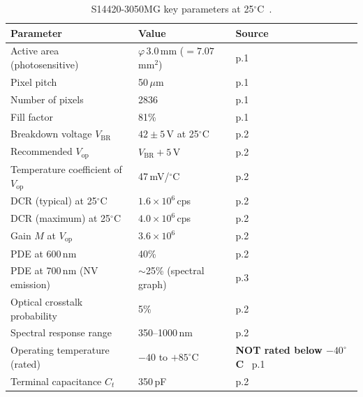 \begin{table}[ht]
\centering
\caption{S14420-3050MG key parameters at 25$^\circ$C~\cite{S14420datasheet}.}
\label{tab:s14420_params}
\small
\begin{tabular}{@{}p{5.5cm}p{3cm}p{4.5cm}@{}}
\toprule
Parameter & Value & Source \\
\midrule
Active area (photosensitive) & $\varphi\,3.0$\,mm ($= 7.07$\,mm$^2$) &
  \cite{S14420datasheet} p.1 \\
Pixel pitch & 50\,$\mu$m & \cite{S14420datasheet} p.1 \\
Number of pixels & 2836 & \cite{S14420datasheet} p.1 \\
Fill factor & 81\% & \cite{S14420datasheet} p.1 \\
Breakdown voltage $V_\mathrm{BR}$ & $42 \pm 5$\,V at 25$^\circ$C &
  \cite{S14420datasheet} p.2 \\
Recommended $V_\mathrm{op}$ & $V_\mathrm{BR} + 5$\,V & \cite{S14420datasheet} p.2 \\
Temperature coefficient of $V_\mathrm{op}$ & 47\,mV/$^\circ$C &
  \cite{S14420datasheet} p.2 \\
DCR (typical) at 25$^\circ$C & $1.6 \times 10^6$\,cps &
  \cite{S14420datasheet} p.2 \\
DCR (maximum) at 25$^\circ$C & $4.0 \times 10^6$\,cps &
  \cite{S14420datasheet} p.2 \\
Gain $M$ at $V_\mathrm{op}$ & $3.6 \times 10^6$ & \cite{S14420datasheet} p.2 \\
PDE at 600\,nm & 40\% & \cite{S14420datasheet} p.2 \\
PDE at 700\,nm (NV emission) & $\sim$25\% (spectral graph) &
  \cite{S14420datasheet} p.3 \\
Optical crosstalk probability & 5\% & \cite{S14420datasheet} p.2 \\
Spectral response range & 350--1000\,nm & \cite{S14420datasheet} p.2 \\
Operating temperature (rated) & $-40$ to $+85^\circ$C &
  \textbf{NOT rated below $-40^\circ$C}~\cite{S14420datasheet} p.1 \\
Terminal capacitance $C_t$ & 350\,pF & \cite{S14420datasheet} p.2 \\
\bottomrule
\end{tabular}
\end{table}

